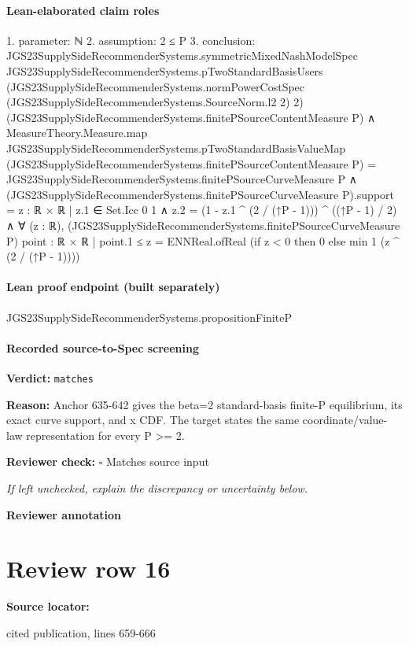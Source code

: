 \documentclass[10pt]{article}
\newcommand{\reviewerbox}{%
  \par\noindent\fbox{\parbox{0.96\linewidth}{\rule{0pt}{0.38in}}}\par
}
\newcommand{\reviewmatch}[1]{%
  \par\noindent\textbf{Reviewer check:} $\square$\; #1\par
  \noindent\emph{If left unchecked, explain the discrepancy or uncertainty below.}\par
}
\begin{document}
\paragraph{Lean-elaborated claim roles}\begin{ReviewVerbatim}
1. parameter: ℕ
2. assumption: 2 ≤ P
3. conclusion: JGS23SupplySideRecommenderSystems.symmetricMixedNashModelSpec JGS23SupplySideRecommenderSystems.pTwoStandardBasisUsers
    (JGS23SupplySideRecommenderSystems.normPowerCostSpec (JGS23SupplySideRecommenderSystems.SourceNorm.l2 2) 2)
    (JGS23SupplySideRecommenderSystems.finitePSourceContentMeasure P) ∧
  MeasureTheory.Measure.map JGS23SupplySideRecommenderSystems.pTwoStandardBasisValueMap
        (JGS23SupplySideRecommenderSystems.finitePSourceContentMeasure P) =
      JGS23SupplySideRecommenderSystems.finitePSourceCurveMeasure P ∧
    (JGS23SupplySideRecommenderSystems.finitePSourceCurveMeasure P).support =
        {z : ℝ × ℝ | z.1 ∈ Set.Icc 0 1 ∧ z.2 = (1 - z.1 ^ (2 / (↑P - 1))) ^ ((↑P - 1) / 2)} ∧
      ∀ (z : ℝ),
        (JGS23SupplySideRecommenderSystems.finitePSourceCurveMeasure P) {point : ℝ × ℝ | point.1 ≤ z} =
          ENNReal.ofReal (if z < 0 then 0 else min 1 (z ^ (2 / (↑P - 1))))
\end{ReviewVerbatim}

\paragraph{Lean proof endpoint (built separately)}\begin{ReviewVerbatim}
JGS23SupplySideRecommenderSystems.propositionFiniteP
\end{ReviewVerbatim}

\paragraph{Recorded source-to-Spec screening}
\textbf{Verdict:} \texttt{matches}
\\
{\raggedright
\textbf{Reason:} Anchor 635-\allowbreak{}642 gives the beta=2 standard-\allowbreak{}basis finite-\allowbreak{}P equilibrium, its exact curve support, and x CDF.\allowbreak{}  The target states the same coordinate/\allowbreak{}value-\allowbreak{}law representation for every P >= 2.\allowbreak{}
\par}
\reviewmatch{Matches source input}
\noindent\textbf{Reviewer annotation}\par
\reviewerbox
\clearpage
\hypertarget{source-claim-5f1111d2a96ef9c6}{}
\section*{Review row 16}
\textbf{Source locator:} {\footnotesize\raggedright cited publication, lines 659-\allowbreak{}666\par}
\end{document}
